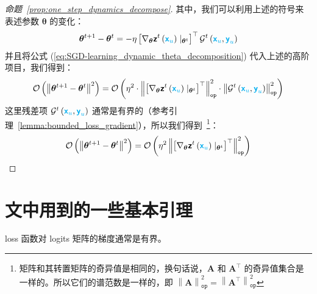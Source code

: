 \documentclass[citestyle=gb7714-2015, bibstyle=gb7714-2015,lang=cn,14pt,scheme=chinese]{elegantbook}
\begin{document}
\begin{proof}[命题~\ref{prop:one_step_dynamics_decompose}]
其中，我们可以利用上述的符号来表述参数 \(\bm{\theta}\) 的变化：
\begin{equation}\label{eq:SGD-learning_dynamic_theta_decomposition}
    \bm{\theta}^{t+1} - \bm{\theta}^{t} = - \eta \left[ \nabla_{\bm{\theta}} \bm{\mathsf{z}}^{t} \left( \textcolor{cyan}{\bm{\mathsf{x}}_{u}} \right) \mid_{\bm{\theta}^{t}}  \right]^{\top} \mathcal{G}^{t} \left( \textcolor{cyan}{\bm{\mathsf{x}}_{u}}, \textcolor{cyan}{\bm{\mathsf{y}}_{u}} \right)
\end{equation}
并且将公式 (\ref{eq:SGD-learning_dynamic_theta_decomposition}) 代入上述的高阶项目，我们得到：
\[
    \mathcal{O} \left( \left\| \bm{\theta}^{t+1} - \bm{\theta}^{t} \right\|^{2} \right) = \mathcal{O} \left( \eta^{2} \cdot \left\| \left[ \nabla_{\bm{\theta}} \bm{\mathsf{z}}^{t} \left( \textcolor{cyan}{\bm{\mathsf{x}}_{u}} \right) \mid_{\bm{\theta}^{t}}  \right]^{\top} \right\|^{2}_{\texttt{op}} \cdot \left\| \mathcal{G}^{t} \left( \textcolor{cyan}{\bm{\mathsf{x}}_{u}}, \textcolor{cyan}{\bm{\mathsf{y}}_{u}} \right) \right\|^{2}_{\texttt{op}}\right)
\]
这里残差项 \(\mathcal{G}^{t} \left( \textcolor{cyan}{\bm{\mathsf{x}}_{u}}, \textcolor{cyan}{\bm{\mathsf{y}}_{u}} \right)\) 通常是有界的（参考引理~\ref{lemma:bounded_loss_gradient}），所以我们得到~\footnote{矩阵和其转置矩阵的奇异值是相同的，换句话说，\(\mathbf{A}\) 和 \(\mathbf{A}^{\top}\) 的奇异值集合是一样的。所以它们的谱范数是一样的，即 \( \left\| \mathbf{A} \right\|^{2}_{\texttt{op}} = \left\| \mathbf{A}^{\top} \right\|^{2}_{\texttt{op}} \)}：
\[
    \mathcal{O} \left( \left\| \bm{\theta}^{t+1} - \bm{\theta}^{t} \right\|^{2} \right) = \mathcal{O} \left( \eta^{2} \left\| \left[ \nabla_{\bm{\theta}} \bm{\mathsf{z}}^{t} \left( \textcolor{cyan}{\bm{\mathsf{x}}_{u}} \right) \mid_{\bm{\theta}^{t}}  \right]^{\top} \right\|^{2}_{\texttt{op}} \right)
\]
\end{proof}




\nocite{*}

\printbibliography[heading=bibintoc, title=\ebibname]
\appendix

\chapter{文中用到的一些基本引理}

\begin{lemma}\label{lemma:bounded_loss_gradient}
    loss 函数对 logits 矩阵的梯度通常是有界。
\end{lemma}
\end{document}
